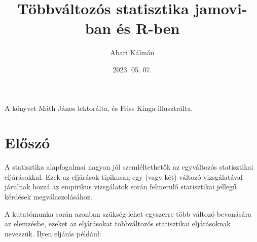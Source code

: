 \documentclass[
  letterpaper,
]{krantz}
\title{Többváltozós statisztika jamovi-ban és R-ben}
\author{Abari Kálmán}
\date{2023. 05. 07.}
\renewcommand*\contentsname{Tartalomjegyzék}
\newcommand\contentsname{Tartalomjegyzék}
\begin{document}
\maketitle

\thispagestyle{empty}

\begin{center}
A könyvet Máth János lektorálta, és Friss Kinga illusztrálta.
\end{center}

\setlength{\abovedisplayskip}{-5pt}
\setlength{\abovedisplayshortskip}{-5pt}


\ifdefined\Shaded\renewenvironment{Shaded}{\begin{tcolorbox}[borderline west={3pt}{0pt}{shadecolor}, interior hidden, breakable, enhanced, frame hidden, boxrule=0pt, sharp corners]}{\end{tcolorbox}}\fi

\renewcommand*\contentsname{Tartalomjegyzék}
{
\hypersetup{linkcolor=}
\setcounter{tocdepth}{2}
\tableofcontents
}
\listoffigures
\listoftables
{}

\hypertarget{sec-eloszo}{%
\chapter*{Előszó}\label{sec-eloszo}}


A statisztika alapfogalmai nagyon jól szemléltethetők az egyváltozós
statisztikai eljárásokkal. Ezek az eljárások tipikusan egy (vagy két)
változó vizsgálatával járulnak hozzá az empirikus vizsgálatok során
felmerülő statisztikai jellegű kérdések megválaszolásához.

A kutatómunka során azonban szükség lehet egyszerre több változó
bevonására az elemzésbe, ezeket az eljárásokat többváltozós statisztikai
eljárásoknak nevezzük. Ilyen eljárás például:
\end{document}
